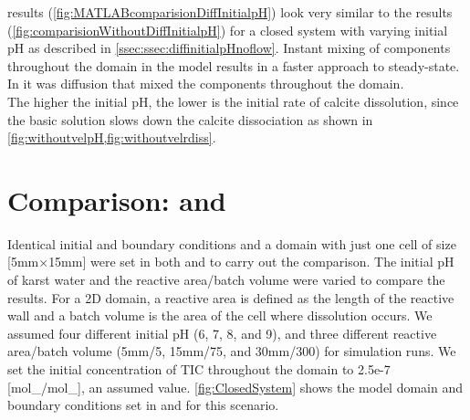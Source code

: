 \MATLAB results (\cref{fig:MATLABcomparisionDiffInitialpH}) look very similar to the \DuMuX results (\cref{fig:comparisionWithoutDiffInitialpH}) 
for a closed system with varying initial pH as described in \cref{ssec:ssec:diffinitialpHnoflow}. Instant mixing of components throughout the domain 
in the \MATLAB model results in a faster approach to steady-state. In \DuMuX it was diffusion that mixed the components throughout the domain. \\

The higher the initial pH, the lower is the initial rate of calcite dissolution, since the basic solution slows down the calcite dissociation 
as shown in \cref{fig:withoutvelpH,fig:withoutvelrdiss}.

\section{Comparison: \DuMuX and \MATLAB} \label{sec:dvm}
Identical initial and boundary conditions and a domain with just one cell of size [5mm$\times$15mm] were set in both \MATLAB and \DuMuX 
to carry out the comparison. The initial pH of karst water and the reactive area/batch volume were varied to compare the results. 
For a 2D domain, a reactive area is defined as the length of the reactive wall and a batch volume is the area of the cell where dissolution occurs. 
We assumed four different initial pH (6, 7, 8, and 9), and three different reactive area/batch 
volume (5mm/5, 15mm/75, and 30mm/300) for simulation runs. We set the initial concentration of TIC 
throughout the domain to 2.5e-7 [mol\_/mol\_], 
an assumed value. \cref{fig:ClosedSystem} shows the model domain and boundary conditions set in \MATLAB and \DuMuX for this scenario. \\

